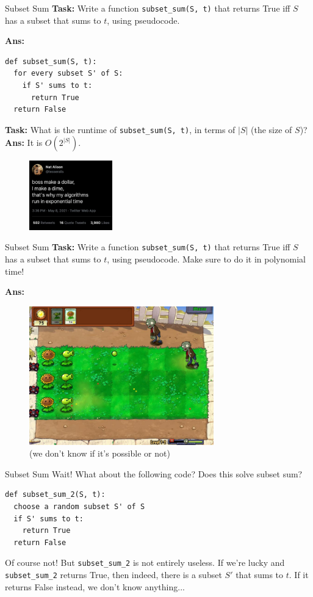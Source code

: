 \documentclass{beamer}
\begin{document}
\begin{frame}[fragile]{Subset Sum}
\textbf{Task:} Write a function \texttt{subset\_sum(S, t)} that returns True iff $S$ has a subset that sums to $t$, using pseudocode.

\textbf{Ans:}
\begin{verbatim}
def subset_sum(S, t):
  for every subset S' of S:
    if S' sums to t:
      return True
  return False
\end{verbatim}

\textbf{Task:} What is the runtime of \texttt{subset\_sum(S, t)}, in terms of $|S|$ (the size of $S$)?
\pause \textbf{Ans:} It is $O(2^{|S|})$.

\begin{figure}[h]
    \centering
    \includegraphics[height=3cm]{img/exp_time.jpg}
\end{figure}
\end{frame}

\begin{frame}{Subset Sum}
\textbf{Task:} Write a function \texttt{subset\_sum(S, t)} that returns True iff $S$ has a subset that sums to $t$, using pseudocode. Make sure to do it in polynomial time!

\textbf{Ans:}
\begin{figure}[h]
    \centering
    \includegraphics[height=6cm]{img/pvz.png}
    \caption*{(we don't know if it's possible or not)}
\end{figure}
\end{frame}

\begin{frame}[fragile]{Subset Sum}
Wait! What about the following code? Does this solve subset sum?

\begin{verbatim}
def subset_sum_2(S, t):
  choose a random subset S' of S
  if S' sums to t:
    return True
  return False
\end{verbatim}
\pause

Of course not! But \texttt{subset\_sum\_2} is not entirely useless. If we're lucky and \texttt{subset\_sum\_2} returns True, then indeed, there is a subset $S'$ that sums to $t$. If it returns False instead, we don't know anything...

\end{frame}
\end{document}

